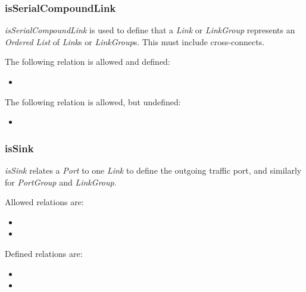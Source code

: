 \subsubsection{isSerialCompoundLink}%
\label{rel:isSerialCompoundLink}

\emph{isSerialCompoundLink} is used to define that a \emph{Link} or \emph{LinkGroup} represents an \emph{Ordered List} of \emph{Link}s or \emph{LinkGroup}s. This must include cross-connects.

The following relation is allowed and defined:
\begin{itemize}
    \item {}
\end{itemize}

The following relation is allowed, but undefined:
\begin{itemize}
    \item {}
\end{itemize}


\subsubsection{isSink}%
\label{rel:isSink}

\emph{isSink} relates a \emph{Port} to one \emph{Link} to define the outgoing traffic port, and similarly for \emph{PortGroup} and \emph{LinkGroup}.

Allowed relations are:
\begin{itemize}
    \item {}
    \item {}
\end{itemize}

Defined relations are:
\begin{itemize}
    \item {}
    \item {}
\end{itemize}

